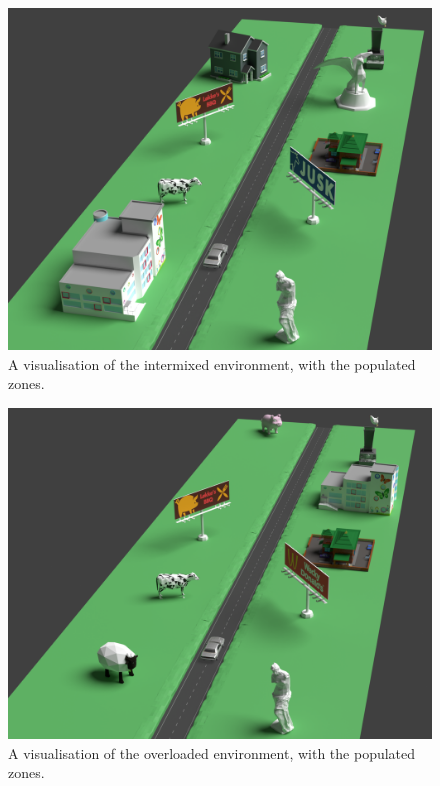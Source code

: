 \begin{multicols}{2}
    \begin{figure}[H]
        \centering
        \includegraphics[width=0.95\linewidth]{figure/Implementation/Intermixed.png}
        \caption{A visualisation of the intermixed environment, with the populated zones.}
        \label{fig:viz_IM}
    \end{figure}
\columnbreak
    \begin{figure}[H]
        \centering
        \includegraphics[width=0.98\linewidth]{figure/Implementation/Overloaded.png}
        \caption{A visualisation of the overloaded environment, with the populated zones.}
        \label{fig:viz_OL}
    \end{figure}
\end{multicols}

